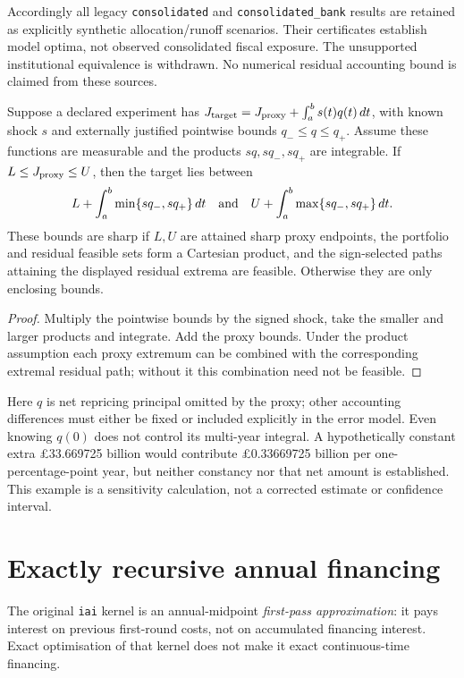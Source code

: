 Accordingly all legacy \texttt{consolidated} and \texttt{consolidated\_bank} results are retained as explicitly synthetic allocation/runoff scenarios. Their certificates establish model optima, not observed consolidated fiscal exposure. The unsupported institutional equivalence is withdrawn. No numerical residual accounting bound is claimed from these sources.

\begin{proposition}\label{prop:accounting}
Suppose a declared experiment has $J_{\rm target}=J_{\rm proxy}+\int_a^b s(t)q(t)\,dt$, with known shock $s$ and externally justified pointwise bounds $q_-\le q\le q_+$. Assume these functions are measurable and the products $sq,sq_-,sq_+$ are integrable. If $L\le J_{\rm proxy}\le U$, then the target lies between
\[
L+\int_a^b\min\{sq_-,sq_+\}\,dt
\quad\hbox{and}\quad
U+\int_a^b\max\{sq_-,sq_+\}\,dt.
\]
These bounds are sharp if $L,U$ are attained sharp proxy endpoints, the portfolio and residual feasible sets form a Cartesian product, and the sign-selected paths attaining the displayed residual extrema are feasible. Otherwise they are only enclosing bounds.
\end{proposition}
\begin{proof}
Multiply the pointwise bounds by the signed shock, take the smaller and larger products and integrate. Add the proxy bounds. Under the product assumption each proxy extremum can be combined with the corresponding extremal residual path; without it this combination need not be feasible.
\end{proof}
Here $q$ is net repricing principal omitted by the proxy; other accounting differences must either be fixed or included explicitly in the error model. Even knowing $q(0)$ does not control its multi-year integral. A hypothetically constant extra \pounds33.669725 billion would contribute \pounds0.33669725 billion per one-percentage-point year, but neither constancy nor that net amount is established. This example is a sensitivity calculation, not a corrected estimate or confidence interval.



\section{Exactly recursive annual financing}\label{sec:recursive}
The original \texttt{iai} kernel is an annual-midpoint \emph{first-pass approximation}: it pays interest on previous first-round costs, not on accumulated financing interest. Exact optimisation of that kernel does not make it exact continuous-time financing.


